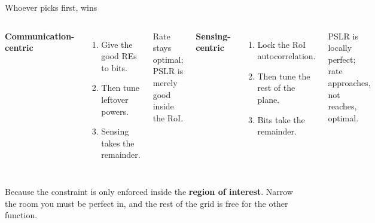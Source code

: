 \begin{frame}{Whoever picks first, wins}
  \vspace{0.4em}
  \begin{columns}[T,onlytextwidth]
      {\small\textbf{\textcolor{ranblue}{Communication-centric}}\par}
      \vspace{0.4em}
      \small
      \begin{enumerate}\itemsep4pt
        \item Give the good REs to bits.
        \item Then tune leftover powers.
        \item Sensing takes the remainder.
      \end{enumerate}

      \vspace{0.4em}
      {\scriptsize\textcolor{softgray}{Rate stays optimal; PSLR is merely good inside the RoI.}\par}
      {\small\textbf{\textcolor{coreorange}{Sensing-centric}}\par}
      \vspace{0.4em}
      \small
      \begin{enumerate}\itemsep4pt
        \item Lock the RoI autocorrelation.
        \item Then tune the rest of the plane.
        \item Bits take the remainder.
      \end{enumerate}

      \vspace{0.4em}
      {\scriptsize\textcolor{softgray}{PSLR is locally perfect; rate approaches, not reaches, optimal.}\par}
  \end{columns}

  \vspace{0.7em}
     {Because the constraint is only enforced inside the \textbf{region of
      interest}. Narrow the room you must be perfect in, and the rest of the grid
      is free for the other function.}
\end{frame}

